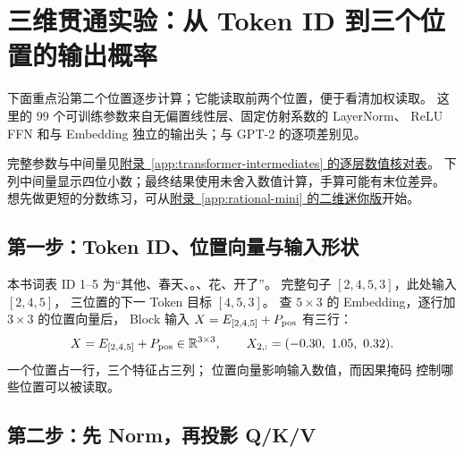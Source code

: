 \chapterrule
\section{三维贯通实验：从 Token ID 到三个位置的输出概率}
\label{intro:transformer-forward-pass}
下面重点沿第二个位置逐步计算；它能读取前两个位置，便于看清加权读取。
这里的 $99$ 个可训练参数来自无偏置线性层、固定仿射系数的 LayerNorm、
ReLU FFN 和与 Embedding 独立的输出头；与 GPT-2 的逐项差别见。

完整参数与中间量见\hyperref[app:transformer-intermediates]{附录~\ref*{app:transformer-intermediates} 的逐层数值核对表}。
下列中间量显示四位小数；最终结果使用未舍入数值计算，手算可能有末位差异。
想先做更短的分数练习，可从\hyperref[app:rational-mini]{附录~\ref*{app:rational-mini} 的二维迷你版}开始。
\par\smallskip


\subsection{第一步：Token ID、位置向量与输入形状}

本书词表 ID 1--5 为“其他、春天、。、花、开了”。
完整句子 $[2,4,5,3]$，此处输入 $[2,4,5]$，
三位置的下一 Token 目标 $[4,5,3]$。
查 $5\times3$ 的 Embedding，逐行加 $3\times3$ 的位置向量后，
Block 输入 $X=E_{[2,4,5]}+P_{\rm pos}$ 有三行：
\begin{equation}
X=E_{[2,4,5]}+P_{\rm pos}\in\mathbb{R}^{3\times3},
\qquad X_{2,:}=(-0.30,\ 1.05,\ 0.32).
\label{eq:running-three-token-x}
\end{equation}
一个位置占一行，三个特征占三列；
位置向量影响输入数值，而因果掩码 控制哪些位置可以被读取。

\subsection{第二步：先 Norm，再投影 Q/K/V}

